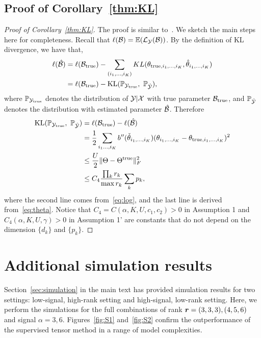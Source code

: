 \documentclass[12pt]{article}
\theoremstyle{definition}
\theoremstyle{definition}
\begin{document}
\subsection{Proof of Corollary~\ref{thm:KL}}
\begin{proof}[Proof of Corollary~\ref{thm:KL}]
The proof is similar to~\citet{pmlr-v108-berthet20a}. We sketch the main steps here for completeness. Recall that $\ell(\mathcal{B})=\mathbb{E}(\mathcal{L}_{\mathcal{Y}}(\mathcal{B}))$. By the definition of KL divergence, we have that,
\begin{align}
\ell(\hat \tB)&=\ell(\trueB)-\sum_{(i_1,\ldots,i_K)} KL(\theta_{\text{true}, i_1,\ldots, i_K}, \hat \theta_{i_1,\ldots,i_K})\\
&=\ell(\trueB)-\text{KL}(\mathbb{P}_{\tY_{\text{true}}},\ \mathbb{P}_{\hat \tY}),
\end{align}
where $\mathbb{P}_{\mathcal{Y}_{\text{true}}}$ denotes the distribution of $\mathcal{Y}|\mathcal{X}$ with true parameter $\mathcal{B}_{\textup{true}}$, and $\mathbb{P}_{\hat {\mathcal{Y}}}$ denotes the distribution with estimated parameter $\hat {\mathcal{B}}$. Therefore
\begin{align}
\text{KL}(\mathbb{P}_{\mathcal{Y}_{\text{true}}},\ \mathbb{P}_{\hat {\mathcal{Y}}}) &= \ell(\mathcal{B}_{\textup{true}})-\ell(\hat {\mathcal{B}})\\
&={1\over 2}\sum_{i_1\ldots,i_K}b''(\check \theta_{i_1,\ldots,i_K})(\theta_{i_1,\ldots,i_K}-\theta_{\text{true},i_1,\ldots,i_K})^2\\
&\leq {U\over 2} \lVert\Theta-\Theta^{\text{true}}\rVert_F^2\\
&\leq C_4{\prod_k r_k \over \max r_k}\sum_k p_k,
\end{align}
where the second line comes from~\eqref{eq:log}, and the last line is derived from~\eqref{eq:theta}. Notice that $C_4 = C(\alpha,K,U,c_1,c_2)>0$ in Assumption 1 and $C_4(\alpha,K,U,\gamma)>0$ in Assumption 1' are constants that do not depend on the dimension $\{d_k\}$ and $\{p_k\}$. 
\end{proof}

\section{Additional simulation results}
Section~\ref{sec:simulation} in the main text has provided simulation results for two settings: low-signal, high-rank setting and high-signal, low-rank setting. Here, we perform the simulations for the full combinations of rank $\bm{r}=(3,3,3), (4,5,6)$ and signal $\alpha=3, 6$. Figures~\ref{fig:S1} and~\ref{fig:S2} confirm the outperformance of the supervised tensor method in a range of model complexities.
\end{document}
